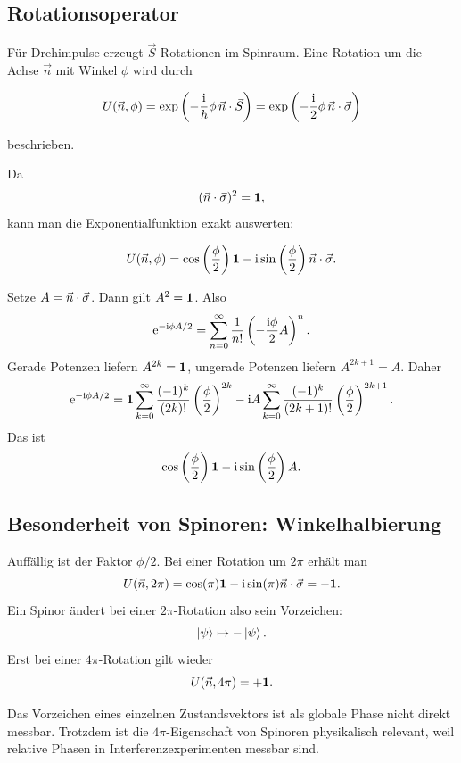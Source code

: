 \subsection{Rotationsoperator}

Für Drehimpulse erzeugt \(\vec S\) Rotationen im Spinraum. Eine Rotation um die Achse \(\vec n\) mit Winkel \(\phi\) wird durch
\begin{formulabox}
\[
    U(\vec n,\phi)
    =\exp\left(-\frac{\mathrm{i}}{\hbar}\phi\,\vec n\cdot\vec S\right)
    =\exp\left(-\frac{\mathrm{i}}{2}\phi\,\vec n\cdot\vec\sigma\right)
\]
\end{formulabox}
beschrieben.

Da
\[
    (\vec n\cdot\vec\sigma)^2=\mathbf{1},
\]
kann man die Exponentialfunktion exakt auswerten:
\begin{formulabox}
\[
    U(\vec n,\phi)
    =\cos\left(\frac{\phi}{2}\right)\mathbf{1}
    -\mathrm{i}\sin\left(\frac{\phi}{2}\right)\vec n\cdot\vec\sigma.
\]
\end{formulabox}

\begin{derivationbox}
Setze \(A=\vec n\cdot\vec\sigma\). Dann gilt \(A^2=\mathbf{1}\). Also
\[
    \mathrm{e}^{-\mathrm{i}\phi A/2}
    =\sum_{n=0}^\infty\frac{1}{n!}\left(-\frac{\mathrm{i}\phi}{2}A\right)^n.
\]
Gerade Potenzen liefern \(A^{2k}=\mathbf{1}\), ungerade Potenzen liefern \(A^{2k+1}=A\). Daher
\[
    \mathrm{e}^{-\mathrm{i}\phi A/2}
    =\mathbf{1}\sum_{k=0}^\infty\frac{(-1)^k}{(2k)!}\left(\frac{\phi}{2}\right)^{2k}
    -\mathrm{i} A\sum_{k=0}^\infty\frac{(-1)^k}{(2k+1)!}\left(\frac{\phi}{2}\right)^{2k+1}.
\]
Das ist
\[
    \cos\left(\frac{\phi}{2}\right)\mathbf{1}
    -\mathrm{i}\sin\left(\frac{\phi}{2}\right)A.
\]
\end{derivationbox}

\subsection{Besonderheit von Spinoren: Winkelhalbierung}

Auffällig ist der Faktor \(\phi/2\). Bei einer Rotation um \(2\pi\) erhält man
\[
    U(\vec n,2\pi)
    =\cos(\pi)\mathbf{1}-\mathrm{i}\sin(\pi)\vec n\cdot\vec\sigma
    =-\mathbf{1}.
\]
Ein Spinor ändert bei einer \(2\pi\)-Rotation also sein Vorzeichen:
\[
    \left|\psi\right\rangle\mapsto -\left|\psi\right\rangle.
\]
Erst bei einer \(4\pi\)-Rotation gilt wieder
\[
    U(\vec n,4\pi)=+\mathbf{1}.
\]

\begin{notebox}
Das Vorzeichen eines einzelnen Zustandsvektors ist als globale Phase nicht direkt messbar. Trotzdem ist die \(4\pi\)-Eigenschaft von Spinoren physikalisch relevant, weil relative Phasen in Interferenzexperimenten messbar sind.
\end{notebox}

